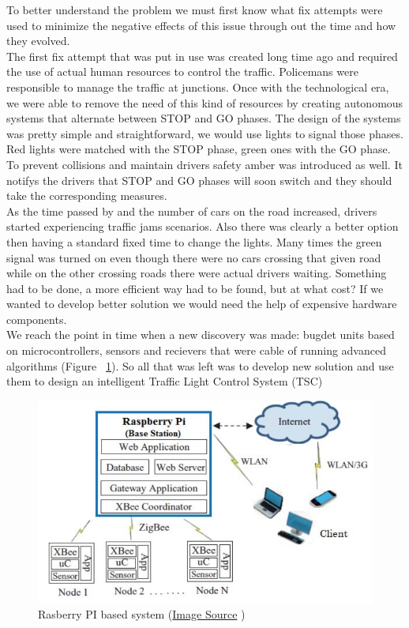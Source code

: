 \documentclass[17pt]{report}
\begin{document}
\indent \indent
To better understand the problem we must first know what fix attempts 
were used to minimize the negative effects of this issue through
out the time and how they evolved.\\
\indent \indent
The first fix attempt that was put in use was created long time ago and required
the use of actual human resources to control the traffic. Policemans were
responsible to manage the traffic at junctions. Once with the  technological
era, we were able to remove the need of this kind of resources by creating
autonomous systems that alternate between STOP and GO phases. The design of the 
systems was pretty simple and straightforward, we would use lights to signal 
those phases. Red lights were matched with the STOP phase, green ones with the
GO phase. To prevent collisions and maintain drivers safety amber was
introduced as well. It notifys the drivers that STOP and GO phases will soon
switch and they should take the corresponding measures.\\
\indent \indent
As the time passed by and the number of cars on the road increased, drivers 
started experiencing traffic jams scenarios. Also there was clearly a better
option then having a standard fixed time to change the lights. Many times
the green signal was turned on even though there were no cars crossing that
given road while on the other crossing roads there were actual drivers waiting.
Something had to be done, a more efficient way had to be found, but at what
cost? If we wanted to develop better solution we would need the help of
expensive hardware components.\\
\indent \indent
We reach the point in time when a new discovery was made: bugdet units based
on  microcontrollers, sensors and recievers \cite{Deshmukh2016} that were
cable of running advanced algorithms (Figure ~\ref{fig:PI}). So all that was left was to develop 
new solution and use them to design an intelligent Traffic Light Control
System (TSC)\\
\begin{figure}[h!]
    \includegraphics[width=\textwidth]{PiSystems.png}
    \caption{Rasberry PI based system 
    (\href{https://www.semanticscholar.org/paper/A-low-cost-environment-monitoring-system-using-Pi-Deshmukh-Shinde/e05a1fb72b08803d40dc06fa202241636fb82c21}{Image Source} \textcopyright ) }
    \label{fig:PI}
\end{figure}
\end{document}
